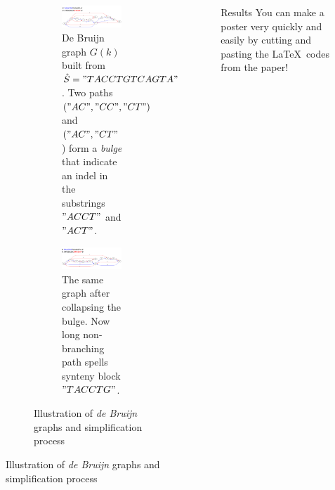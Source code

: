 \documentclass[final,hyperref={pdfpagelabels=false}]{beamer}
\begin{document}
\begin{frame}{}
\begin{columns}[t]
\begin{column}{0.32\linewidth}
\begin{figure}
\begin{figure}
        \begin{subfigure}[a]{1\textwidth}
		\centering
		\includegraphics[scale = 0.75]{graph1.pdf}
		\justifying
		\small \caption{De Bruijn graph \(G(k)\) built from \(\hat{S} = "TACCTGTCAGTA"\). Two paths \(("AC", "CC", "CT")\) and \(("AC", "CT"\)) form
		a \textit{bulge} that indicate an indel in the substrings \("ACCT"\) and \("ACT"\). }
		\label{DeBruijnA}
        \end{subfigure}
        \begin{subfigure}[b]{1\textwidth}
		\centering
		\includegraphics[scale = 0.75]{graph2.pdf}
		\small \caption{The same graph after collapsing the bulge. Now long non-branching path spells synteny block \("TACCTG"\).}
		\label{DeBruijnB}
        \end{subfigure}
	\small \caption{Illustration of \textit{de Bruijn} graphs and simplification process}
\end{figure}

\end{figure}

\end{column}

\begin{column}{0.32\linewidth}

\begin{block}{Results} \justifying
You can make a poster very quickly and easily by cutting and pasting the \LaTeX~codes from the paper!
\end{block}


\end{column}
\end{columns}
\end{frame}
\end{document}
